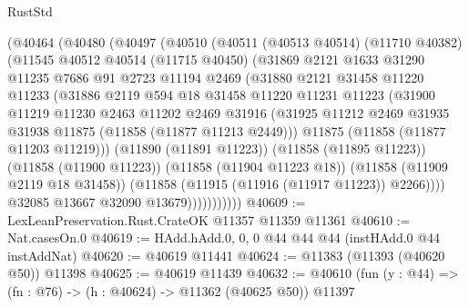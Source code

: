 \begin{lexlean}{RustStd}
\begin{coremodule}
            (@40464
              (@40480
                (@40497
                  (@40510
                    (@40511
                      (@40513 @40514)
                      (@11710 @40382)
                      (@11545
                        @40512
                        @40514
                        (@11715 @40450)
                        (@31869
                          @2121
                          @1633
                          @31290
                          @11235
                          @7686
                          @91
                          @2723
                          @11194
                          @2469
                          (@31880
                            @2121
                            @31458
                            @11220
                            @11233
                            (@31886
                              @2119
                              @594
                              @18
                              @31458
                              @11220
                              @11231
                              @11223
                              (@31900
                                @11219
                                @11230
                                @2463
                                @11202
                                @2469
                                @31916
                                (@31925
                                  @11212
                                  @2469
                                  @31935
                                  @31938
                                  @11875
                                  (@11858 (@11877 @11213 @2449)))
                                @11875
                                (@11858 (@11877 @11203 @11219)))
                              (@11890 (@11891 @11223))
                              (@11858 (@11895 @11223))
                              (@11858 (@11900 @11223))
                              (@11858 (@11904 @11223 @18))
                              (@11858 (@11909 @2119 @18 @31458))
                              (@11858 (@11915 (@11916 (@11917 @11223)) @2266))))
                          @32085
                          @13667
                          @32090
                          @13679)))))))))))
@40609 := LexLeanPreservation.Rust.CrateOK @11357 @11359 @11361
@40610 := Nat.casesOn.{0}
@40619 := HAdd.hAdd.{0, 0, 0} @44 @44 @44 (instHAdd.{0} @44 instAddNat)
@40620 := @40619 @11441
@40624 := @11383 (@11393 (@40620 @50)) @11398
@40625 := @40619 @11439
@40632 := @40610 (fun (y : @44) => (fn : @76) -> (h : @40624) -> @11362 (@40625 @50)) @11397

\end{coremodule}
\end{lexlean}
